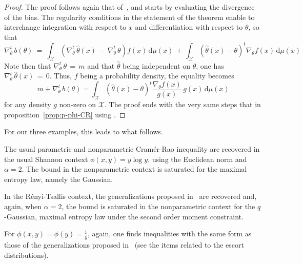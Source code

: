 \documentclass[entropy,article,submit,moreauthors,pdftex]{Definitions/mdpi}
\newcounter{GaussExample}%
\newcounter{qGaussExample}%
\newcounter{arcsineExample}%
\def\dmu{\mathrm{d}\mu}%
\def\X{\mathcal{X}}%
\begin{document}
\begin{proof}
  The proof  follows again  that of~\cite{Ber13}, and  starts by  evaluating the
  divergence of  the bias.  The  regularity conditions  in the statement  of the
  theorem  enable   to  interchange   integration  with   respect  to   $x$  and
  differentiation with respect to $\theta$, so that
  \[
  \nabla_\theta^t  \,  b(\theta)  \:  = \:  \int_\X  \left(  \nabla_\theta^t  \,
  \widehat{\theta}(x) \, - \, \nabla_\theta^t  \, \theta \right) f(x) \, \dmu(x)
  \, +  \, \int_\X \left(  \widehat{\theta}(x) - \theta  \right)^t \nabla_\theta
  f(x) \, \dmu(x)
  \]
  Note   then  that   $\nabla_\theta^t  \,   \theta  \,   =  \,   m$  and   that
  $\widehat{\theta}$ being independent on  $\theta$, one has $\nabla_\theta^t \,
  \widehat{\theta}(x) \,  = \, 0$.  Thus,  $f$ being a probability  density, the
  equality becomes
  \[
  m + \nabla_\theta^t \, b(\theta) = \int_\X \left( \widehat{\theta}(x) - \theta
  \right)^t \frac{\nabla_\theta f(x)}{g(x)} \, g(x) \, \dmu(x)
  \]
  for any density $g$ non-zero on $\X$.  The proof ends with the very same steps
  that in proposition~\ref{prop:p-phi-CR} using \cite[Lemma~2]{Ber13}.
\end{proof}

%
For our three examples, this leads to what follows.
%
\begin{Example}
  The usual  parametric and nonparametric Cram\'er-Rao  inequality are recovered
  in the usual Shannon context $\phi(x,y) =  y \log y$, using the Euclidean norm
  and $\alpha = 2$. The bound in  the nonparametric context is saturated for the
  maximal entropy law, namely the Gaussian.
\end{Example}
%
\begin{Example}
  In    the    R\'enyi-Tsallis    context,    the    generalizations    proposed
  in~\cite{Ber12:06_1, Ber12:06_2, Ber13} are recovered and, again, when $\alpha
  =  2$,  the   bound  is  saturated  in  the  nonparametric   context  for  the
  $q$-Gaussian, maximal entropy law under the second order moment constraint.
\end{Example}
%
\begin{Example}
  For $\phi(x,y)  = \phi(y) =  \frac{1}{y}$, again, one finds  inequalities with
  the same  form as those  of the generalizations  proposed in~\cite{Ber12:06_1,
    Ber12:06_2, Ber13} (see the items related to the escort distributions).
\end{Example}
\end{document}
